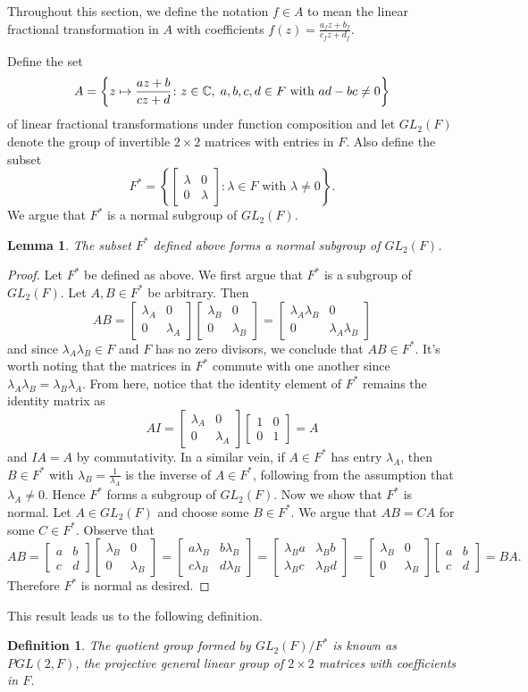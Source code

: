 \documentclass[12pt]{article}
\newcommand{\C}{\mathbb{C}}
\newcommand{\lftmat}[4]{\begin{bmatrix} {#1} & {#2} \\ {#3} & {#4} \end{bmatrix}}
\newcommand{\stanlftmat}{\lftmat{a}{b}{c}{d}}
\newcommand{\ttc}{, \hspace{1mm}}
\theoremstyle{plain}
\newtheorem{definition}[theorem]{Definition}
\newtheorem{lemma}[theorem]{Lemma}
\theoremstyle{definition}
\begin{document}
\begin{appendices}
Throughout this section, we define the notation $f\in A$ to mean the linear fractional transformation in $A$ with coefficients $f(z) = \frac{a_fz + b_f}{c_fz + d_f}$.

\noindent Define the set
	\[
		A = \left\lbrace z\mapsto \frac{az + b}{cz + d}\colon z\in\C\ttc a,b,c,d\in F\text{ with } ad - bc \neq 0\right\rbrace
	\]
of linear fractional transformations under function composition and let $GL_2(F)$ denote the group of invertible $2\times 2$ matrices with entries in $F$. Also define the subset
	\[
		F^* = \left\lbrace\lftmat{\lambda}{0}{0}{\lambda}\colon \lambda\in F\text{ with } \lambda\neq 0 \right\rbrace.
	\]
	We argue that $F^*$ is a normal subgroup of $GL_2(F)$.
\begin{lemma}\label{thm:normalF^*}
	The subset $F^*$ defined above forms a normal subgroup of $GL_2(F)$.
\end{lemma}
\begin{proof}
	Let $F^*$ be defined as above. We first argue that $F^*$ is a subgroup of $GL_2(F)$. Let $A,B\in F^*$ be arbitrary. Then
	\[
		AB = \lftmat{\lambda_A}{0}{0}{\lambda_A}\lftmat{\lambda_B}{0}{0}{\lambda_B} = \lftmat{\lambda_A\lambda_B}{0}{0}{\lambda_A\lambda_B}
	\]
	and since $\lambda_A\lambda_B\in F$ and $F$ has no zero divisors, we conclude that $AB\in F^*$. It's worth noting that the matrices in $F^*$ commute with one another since $\lambda_A\lambda_B = \lambda_B\lambda_A$. From here, notice that the identity element of $F^*$ remains the identity matrix as
	\[
		AI = \lftmat{\lambda_A}{0}{0}{\lambda_A}\lftmat{1}{0}{0}{1} = A
	\]
	and $IA = A$ by commutativity. In a similar vein, if $A\in F^*$ has entry $\lambda_A$, then $B\in F^*$ with $\lambda_B = \frac{1}{\lambda_A}$ is the inverse of $A\in F^*$, following from the assumption that $\lambda_A \neq 0$. Hence $F^*$ forms a subgroup of $GL_2(F)$. Now we show that $F^*$ is normal. Let $A\in GL_2(F)$ and choose some $B\in F^*$. We argue that $AB = CA$ for some $C\in F^*$. Observe that
	\[
		AB = \stanlftmat\lftmat{\lambda_B}{0}{0}{\lambda_B} = \lftmat{a\lambda_B}{b\lambda_B}{c\lambda_B}{d\lambda_B} = \lftmat{\lambda_B a}{\lambda_B b}{\lambda_B c}{\lambda_B d} = \lftmat{\lambda_B}{0}{0}{\lambda_B}\stanlftmat = BA.
	\]
	Therefore $F^*$ is normal as desired.
\end{proof}

This result leads us to the following definition.
\begin{definition}\label{def:PGL2F}
	The quotient group formed by $GL_2(F)/F^*$ is known as $PGL(2,F)$, the projective general linear group of $2\times 2$ matrices with coefficients in $F$.
\end{definition}


\end{appendices}
\end{document}
